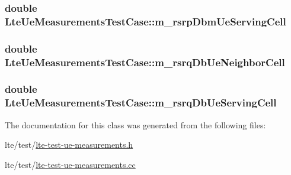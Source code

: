 \subsubsection[{\texorpdfstring{m\+\_\+rsrp\+Dbm\+Ue\+Serving\+Cell}{m_rsrpDbmUeServingCell}}]{\setlength{\rightskip}{0pt plus 5cm}double Lte\+Ue\+Measurements\+Test\+Case\+::m\+\_\+rsrp\+Dbm\+Ue\+Serving\+Cell\hspace{0.3cm}{\ttfamily [private]}}\hypertarget{classLteUeMeasurementsTestCase_a5afd5051a96e8cd850511637ad12aa1d}{}\label{classLteUeMeasurementsTestCase_a5afd5051a96e8cd850511637ad12aa1d}
\subsubsection[{\texorpdfstring{m\+\_\+rsrq\+Db\+Ue\+Neighbor\+Cell}{m_rsrqDbUeNeighborCell}}]{\setlength{\rightskip}{0pt plus 5cm}double Lte\+Ue\+Measurements\+Test\+Case\+::m\+\_\+rsrq\+Db\+Ue\+Neighbor\+Cell\hspace{0.3cm}{\ttfamily [private]}}\hypertarget{classLteUeMeasurementsTestCase_ac11f0c198f29818957516ebfe9c5853b}{}\label{classLteUeMeasurementsTestCase_ac11f0c198f29818957516ebfe9c5853b}
\subsubsection[{\texorpdfstring{m\+\_\+rsrq\+Db\+Ue\+Serving\+Cell}{m_rsrqDbUeServingCell}}]{\setlength{\rightskip}{0pt plus 5cm}double Lte\+Ue\+Measurements\+Test\+Case\+::m\+\_\+rsrq\+Db\+Ue\+Serving\+Cell\hspace{0.3cm}{\ttfamily [private]}}\hypertarget{classLteUeMeasurementsTestCase_a4f5cb7b7b1948192712b9df5cbba1e0b}{}\label{classLteUeMeasurementsTestCase_a4f5cb7b7b1948192712b9df5cbba1e0b}


The documentation for this class was generated from the following files\+:\begin{DoxyCompactItemize}
\item 
lte/test/\hyperlink{lte-test-ue-measurements_8h}{lte-\/test-\/ue-\/measurements.\+h}\item 
lte/test/\hyperlink{lte-test-ue-measurements_8cc}{lte-\/test-\/ue-\/measurements.\+cc}\end{DoxyCompactItemize}
